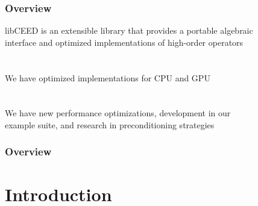 \documentclass{beamer}
\begin{document}
\begin{frame}
\begin{center}
\frametitle{Overview}

libCEED is an extensible library that provides a portable algebraic\\
interface and optimized implementations of high-order operators\\

~\\

~\\

We have optimized implementations for CPU and GPU\\

~\\

~\\

We have new performance optimizations, development in our\\example suite, and research in preconditioning strategies

\end{center}
\end{frame}
 

\begin{frame}
\frametitle{Overview} %
\tableofcontents %
\end{frame}


\section{Introduction}
\end{document}
